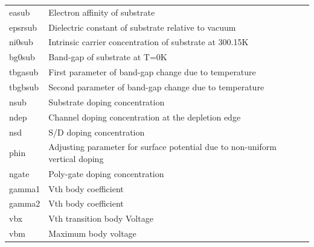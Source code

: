 \begin{longtable}{l l}
{\small easub} & {\small Electron affinity of substrate} \\
{\small epsrsub} & {\small Dielectric constant of substrate relative to vacuum} \\
{\small ni0sub} & {\small Intrinsic carrier concentration of substrate at 300.15K} \\
{\small bg0sub} & {\small Band-gap of substrate at T=0K} \\
{\small tbgasub} & {\small First parameter of band-gap change due to temperature} \\
{\small tbgbsub} & {\small Second parameter of band-gap change due to temperature} \\
{\small nsub} & {\small Substrate doping concentration} \\
{\small ndep} & {\small Channel doping concentration at the depletion edge} \\
{\small nsd} & {\small S/D doping concentration} \\
{\small phin} & {\small Adjusting parameter for surface potential due to non-uniform vertical doping} \\
{\small ngate} & {\small Poly-gate doping concentration} \\
{\small gamma1} & {\small Vth body coefficient} \\
{\small gamma2} & {\small Vth body coefficient} \\
{\small vbx} & {\small Vth transition body Voltage} \\
{\small vbm} & {\small Maximum body voltage} \\


\end{longtable}
